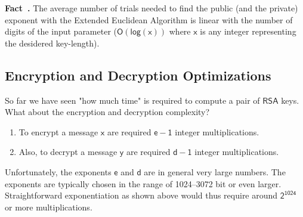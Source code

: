 \documentclass{article}
\newcounter{fact}[section]
\newenvironment{fact}[1][]{\refstepcounter{fact}\par\medskip
   \noindent \textbf{Fact~\thefact. #1} \rmfamily}{\medskip}
\begin{document}
\begin{fact}
    The average number of trials needed to find the public (and the private) exponent with the Extended Euclidean Algorithm is linear with the number of digits of the input parameter ($\mathsf{O(log(x))}$ where $\mathsf{x}$ is any integer representing the desidered key-length).
\end{fact}

\subsection{Encryption and Decryption Optimizations}
\par So far we have seen "how much time" is required to compute a pair of $\mathsf{RSA}$ keys. What about the encryption and decryption complexity?

\begin{enumerate}
    \item To encrypt a message $\mathsf{x}$ are required $\mathsf{e-1}$ integer multiplications.
    \item Also, to decrypt a message $\mathsf{y}$ are required $\mathsf{d-1}$ integer multiplications.
\end{enumerate}

\par \noindent Unfortunately, the exponents $\mathsf{e}$ and $\mathsf{d}$ are in general very large numbers. The exponents are typically chosen in the range of 1024–3072 bit or even larger. Straightforward exponentiation as shown above would thus require around $\mathsf{2^{1024}}$ or more multiplications.

%
\end{document}
